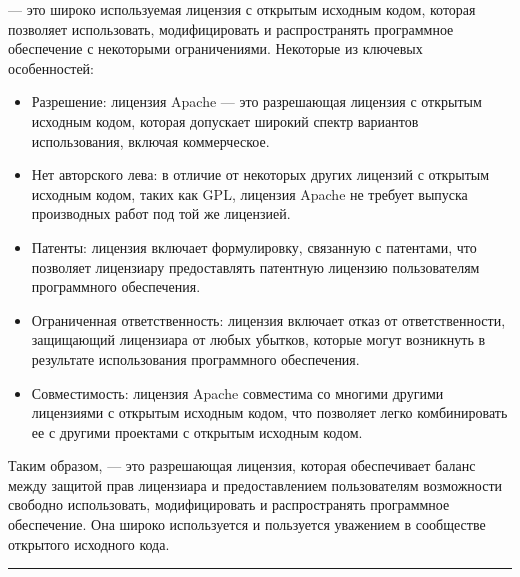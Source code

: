 \documentclass[letterpaper,10pt,russian]{sphinxmanual}
\begin{document}
\sphinxAtStartPar
{} — это широко используемая лицензия с открытым исходным кодом, которая позволяет использовать, модифицировать и распространять программное обеспечение с некоторыми ограничениями. Некоторые из ключевых особенностей:
\begin{itemize}
\item {} 
\sphinxAtStartPar
Разрешение: лицензия Apache — это разрешающая лицензия с открытым исходным кодом, которая допускает широкий спектр вариантов использования, включая коммерческое.

\item {} 
\sphinxAtStartPar
Нет авторского лева: в отличие от некоторых других лицензий с открытым исходным кодом, таких как GPL, лицензия Apache не требует выпуска производных работ под той же лицензией.

\item {} 
\sphinxAtStartPar
Патенты: лицензия включает формулировку, связанную с патентами, что позволяет лицензиару предоставлять патентную лицензию пользователям программного обеспечения.

\item {} 
\sphinxAtStartPar
Ограниченная ответственность: лицензия включает отказ от ответственности, защищающий лицензиара от любых убытков, которые могут возникнуть в результате использования программного обеспечения.

\item {} 
\sphinxAtStartPar
Совместимость: лицензия Apache совместима со многими другими лицензиями с открытым исходным кодом, что позволяет легко комбинировать ее с другими проектами с открытым исходным кодом.

\end{itemize}

\sphinxAtStartPar
Таким образом,  — это разрешающая лицензия, которая обеспечивает баланс между защитой прав лицензиара и предоставлением пользователям возможности свободно использовать, модифицировать и распространять программное обеспечение. Она широко используется и пользуется уважением в сообществе открытого исходного кода.


\bigskip\hrule\bigskip
\end{document}
